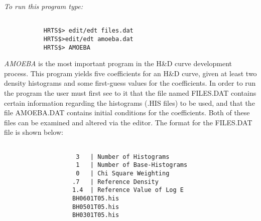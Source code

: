 {\em To run this program type:}
\begin{verbatim}

           HRTS$> edit/edt files.dat
           HRTS$>edit/edt amoeba.dat
           HRTS$> AMOEBA

\end{verbatim}
{\em AMOEBA} is the most important program in the H\&D curve development
   process.  This program yields five coefficients for an H\&D curve, given
   at least two density histograms and some first-guess values for the
   coefficients.  In order to run the program the user must first see to
   it that the file named FILES.DAT contains certain information regarding
   the histograms (.HIS files) to be used, and that the file AMOEBA.DAT
   contains initial conditions for the coefficients.  Both of these files
   can be examined and altered via the editor.
      The format for the FILES.DAT file is shown below:
\begin{center}
\begin{verbatim}

                    3   | Number of Histograms
                    1   | Number of Base-Histograms
                    0   | Chi Square Weighting
                   .7   | Reference Density
                   1.4  | Reference Value of Log E
                   BH0601T05.his
                   BH0501T05.his
                   BH0301T05.his
\end{verbatim}
\end{center}

